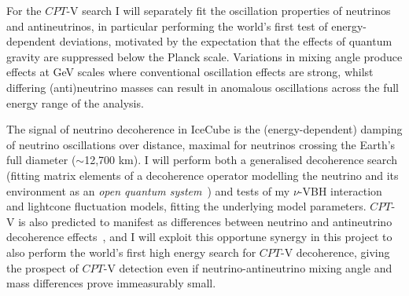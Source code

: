 \documentclass[a4paper,11pt]{article}
\begin{document}
For the $CPT$-V search I will separately fit the oscillation properties of neutrinos and antineutrinos, in particular performing the world's first test of energy-dependent deviations, motivated by the expectation that the effects of quantum gravity are suppressed below the Planck scale. Variations in mixing angle produce effects at GeV scales where conventional oscillation effects are strong, whilst differing (anti)neutrino masses can result in anomalous oscillations across the full energy range of the analysis.


The signal of neutrino decoherence in IceCube is the (energy-dependent) damping of neutrino oscillations over distance, maximal for neutrinos crossing the Earth's full diameter ($\sim$12,700 km). I will perform both a generalised decoherence search (fitting matrix elements of a decoherence operator modelling the neutrino and its environment as an \textit{open quantum system}~\cite{lindblad1976, Benatti_2000, gago2002study, PhysRevLett.85.1166}) and tests of my $\nu$-VBH interaction and lightcone fluctuation models, fitting the underlying model parameters. $CPT$-V is also predicted to manifest as differences between neutrino and antineutrino decoherence effects~\cite{Mavromatos_2009, Barenboim:2004wu, Carrasco:2018sca, Buoninfante:2020iyr, Capolupo:2020myw, Mavromatos:2004gh}, and I will exploit this opportune synergy in this project to also perform the world's first high energy search for $CPT$-V decoherence, giving the prospect of $CPT$-V detection even if neutrino-antineutrino mixing angle and mass differences prove immeasurably small. 

\end{document}
